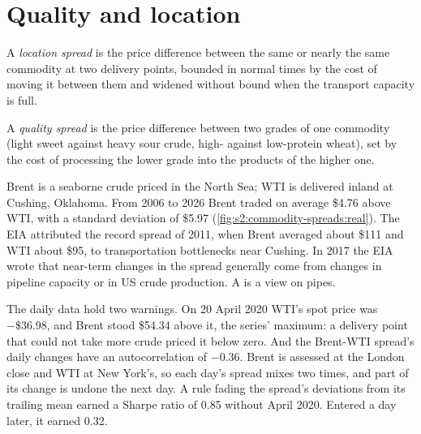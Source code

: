 \section{Quality and location}

\begin{definition}\label{def:s2:commodity-spreads:location}
A \emph{location spread} is the price difference between the same or nearly the same commodity at two delivery points, bounded
in normal times by the cost of moving it between them and widened without bound when the transport capacity is full.
\end{definition}

\begin{definition}\label{def:s2:commodity-spreads:quality}
A \emph{quality spread} is the price difference between two grades of one commodity (light sweet against heavy sour crude,
high- against low-protein wheat), set by the cost of processing the lower grade into the products of the higher one.
\end{definition}

Brent is a seaborne crude priced in the North Sea; WTI is delivered inland at Cushing, Oklahoma. From 2006 to 2026 Brent traded on average \$4.76
above WTI, with a standard deviation of \$5.97 (\cref{fig:s2:commodity-spreads:real}). The EIA attributed the record spread of 2011, when Brent
averaged about \$111 and WTI about \$95, to transportation bottlenecks near Cushing. In 2017 the EIA wrote that near-term changes in the spread
generally come from changes in pipeline capacity or in US crude production. A  is a view on pipes.

The daily data hold two warnings. On 20 April 2020 WTI's spot price was $-\$36.98$, and Brent stood \$54.34 above it, the series' maximum: a delivery
point that could not take more crude priced it below zero. And the Brent-WTI spread's daily changes have an autocorrelation of $-0.36$. Brent is
assessed at the London close and WTI at New York's, so each day's spread mixes two times, and part of its change is undone the next day. A rule
fading the spread's deviations from its trailing mean earned a Sharpe ratio of 0.85 without April 2020. Entered a day later, it earned 0.32.

